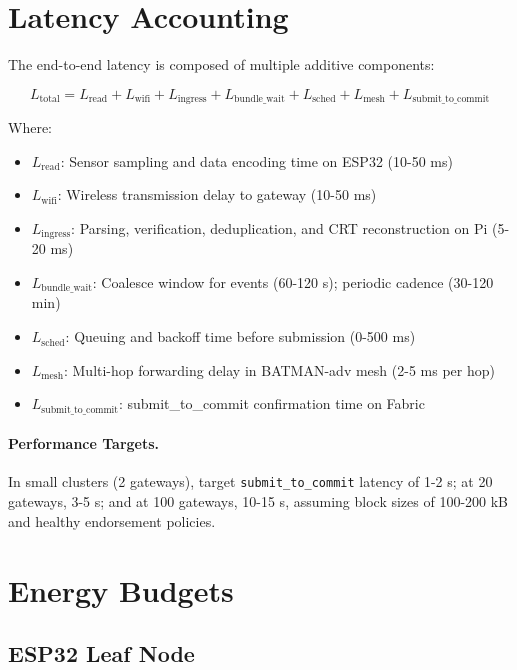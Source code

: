 \documentclass[12pt]{article}
\begin{document}
\section{Latency Accounting}
\label{sec:latency}

The end-to-end latency is composed of multiple additive components:

\begin{equation}
L_{\text{total}} = L_{\text{read}} + L_{\text{wifi}} + L_{\text{ingress}} + L_{\text{bundle\_wait}} + L_{\text{sched}} + L_{\text{mesh}} + L_{\text{submit\_to\_commit}}
\end{equation}

Where:
\begin{itemize}
    \item $L_{\text{read}}$: Sensor sampling and data encoding time on ESP32 (10-50 ms)
    \item $L_{\text{wifi}}$: Wireless transmission delay to gateway (10-50 ms)
    \item $L_{\text{ingress}}$: Parsing, verification, deduplication, and \gls{CRT} reconstruction on Pi (5-20 ms)
    \item $L_{\text{bundle\_wait}}$: \gls{Coalesce window} for events (60-120 s); periodic cadence (30-120 min)
    \item $L_{\text{sched}}$: Queuing and backoff time before submission (0-500 ms)
    \item $L_{\text{mesh}}$: Multi-hop forwarding delay in \gls{BATMAN-adv} mesh (2-5 ms per hop)
    \item $L_{\text{submit\_to\_commit}}$: \gls{submit_to_commit} confirmation time on Fabric
\end{itemize}

\paragraph{Performance Targets.} In small clusters (2 gateways), target \texttt{submit\_to\_commit} latency of 1-2 s; at 20 gateways, 3-5 s; and at 100 gateways, 10-15 s, assuming block sizes of 100-200 kB and healthy endorsement policies.

\section{Energy Budgets}
\label{sec:energy}

\subsection{ESP32 Leaf Node}
\end{document}
